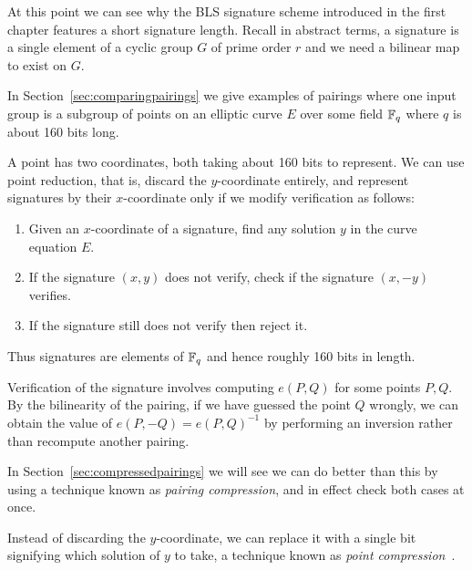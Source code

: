 At this point we can see why
the BLS signature scheme introduced
in the first chapter features a short signature length.
Recall in abstract terms,
a signature is a single element of a cyclic group $G$ of prime order $r$
and we need a bilinear map to exist on $G$.

In Section~\ref{sec:comparingpairings} we give examples
of pairings where one input group is a subgroup of points
on an elliptic curve $E$ over some field $\mathbb{F}_q$ where
$q$ is about 160 bits long.

A point has two coordinates, both taking about 160 bits to represent.
We can use point reduction, that is, discard the $y$-coordinate entirely,
and represent signatures by their $x$-coordinate only if we modify
verification as follows:
\begin{enumerate}
\item
Given an $x$-coordinate of a signature, find any solution $y$
in the curve equation $E$.
\item
If the signature $(x,y)$ does not verify,
check if the signature $(x, -y)$ verifies.
\item
If the signature still does not verify then reject it.
\end{enumerate}

Thus signatures are elements of $\mathbb{F}_q$ and hence roughly 160 bits in length.

Verification of the signature involves computing $e(P, Q)$ for some points
$P, Q$. By the bilinearity of the pairing, if we have guessed the point $Q$
wrongly, we can obtain the value of $e(P,-Q) = e(P,Q)^{-1}$ by performing
an inversion rather than recompute another pairing.

In Section~\ref{sec:compressedpairings} we will see we can do better
than this by using a technique known
as \emph{pairing compression}, and in effect check both
cases at once.

Instead of discarding the $y$-coordinate, we can
replace it with a single bit signifying which solution of $y$ to take,
a technique known as \emph{point compression}~\cite[Section IV.4]{bss}.
